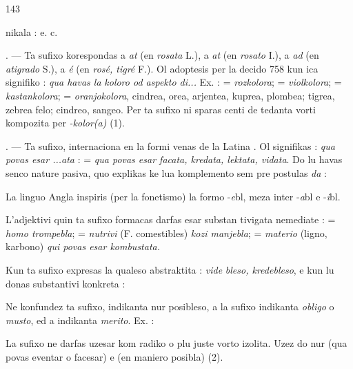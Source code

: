 \begin{VUpage}[147]{143}

\VUcontinue
nikala  : \nl
{} e. c.

. --- Ta sufixo korespondas a \textit{at} (en \textit{rosata} L.), a \textit{at} (en\nl
\textit{rosato} I.), a \textit{ad} (en \textit{atigrado} S.), a \textit{é} (en \textit{rosé, tigré} F.). Ol\nl
adoptesis per la decido 758 kun ica signifiko : \textit{qua havas la}\nl
\textit{koloro od aspekto di...} Ex. :  = \textit{rozkolora};  =\nl
\textit{violkolora};  = \textit{kastankolora};  = \textit{oranjokolora},\nl
cindrea, orea, arjentea, kuprea, plombea; tigrea, zebrea felo;\nl
cindreo, sangeo. Per ta sufixo ni sparas centi de tedanta\nl
vorti kompozita per \textit{-kolor(a)} (1).

. --- Ta sufixo, internaciona en la formi \nl
{} venas de la Latina . Ol signifikas :\nl
\textit{qua povas esar ...ata} : \nl
= \textit{qua povas esar facata, kredata, lektata, vidata}. Do lu havas\nl
senco nature pasiva, quo explikas ke lua komplemento sem\cc
pre postulas \textit{da} : 

La linguo Angla inspiris (per la fonetismo) la formo\nl
-\textit{e}bl, meza inter -\textit{a}bl e -\textit{i}bl.

L'adjektivi quin ta sufixo formacas darfas esar substan\cc
tivigata nemediate :  = \textit{homo trompebla}; \nl
= \textit{nutrivi} (F. comestibles) \textit{kozi manjebla};  =\nl
\textit{materio} (ligno, karbono) \textit{qui povas esar kombustata.}

Kun  ta sufixo expresas la qualeso abstraktita : \textit{vide}\cc
\textit{bleso, kredebleso}, e kun  lu donas substantivi konkreta :\nl
{}

Ne konfundez ta sufixo, indikanta nur posibleso, a la\nl
sufixo  indikanta \textit{obligo} o \textit{musto}, ed a  indikanta\nl
\textit{merito}. Ex. : \parplein

La sufixo  ne darfas uzesar kom radiko o plu juste\nl
vorto izolita. Uzez do nur  (qua povas eventar o\nl
facesar) e  (en maniero posibla) (2).
\end{VUpage}


